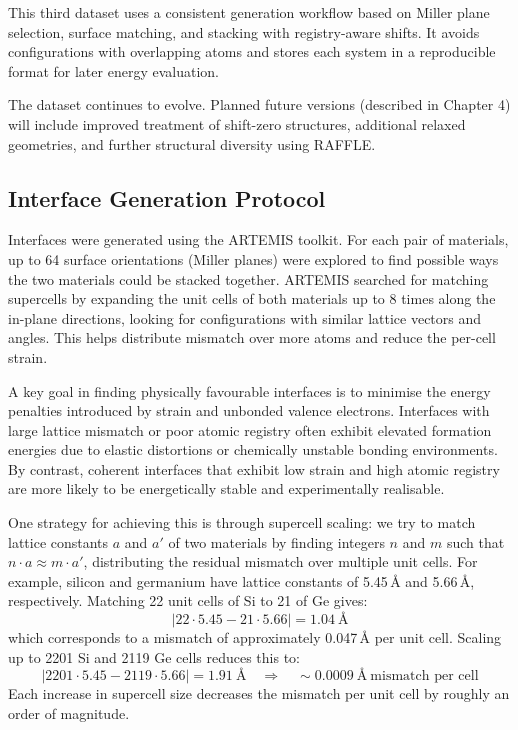 This third dataset uses a consistent generation workflow based on Miller plane selection, surface matching, and stacking with registry-aware shifts. It avoids configurations with overlapping atoms and stores each system in a reproducible format for later energy evaluation.

The dataset continues to evolve. Planned future versions (described in Chapter 4) will include improved treatment of shift-zero structures, additional relaxed geometries, and further structural diversity using RAFFLE.

\subsection{Interface Generation Protocol}

Interfaces were generated using the ARTEMIS toolkit. For each pair of materials, up to 64 surface orientations (Miller planes) were explored to find possible ways the two materials could be stacked together. ARTEMIS searched for matching supercells by expanding the unit cells of both materials up to 8 times along the in-plane directions, looking for configurations with similar lattice vectors and angles. This helps distribute mismatch over more atoms and reduce the per-cell strain.

A key goal in finding physically favourable interfaces is to minimise the energy penalties introduced by strain and unbonded valence electrons. Interfaces with large lattice mismatch or poor atomic registry often exhibit elevated formation energies due to elastic distortions or chemically unstable bonding environments. By contrast, coherent interfaces that exhibit low strain and high atomic registry are more likely to be energetically stable and experimentally realisable.

One strategy for achieving this is through supercell scaling: we try to match lattice constants $a$ and $a'$ of two materials by finding integers $n$ and $m$ such that $n \cdot a \approx m \cdot a'$, distributing the residual mismatch over multiple unit cells. For example, silicon and germanium have lattice constants of 5.45\,\AA{} and 5.66\,\AA{}, respectively. Matching 22 unit cells of Si to 21 of Ge gives:
\[
|22 \cdot 5.45 - 21 \cdot 5.66| = 1.04~\text{\AA}
\]
which corresponds to a mismatch of approximately 0.047\,\AA{} per unit cell. Scaling up to 2201 Si and 2119 Ge cells reduces this to:
\[
|2201 \cdot 5.45 - 2119 \cdot 5.66| = 1.91~\text{\AA} \quad \Rightarrow \quad \sim 0.0009~\text{\AA}~\text{mismatch per cell}
\]
Each increase in supercell size decreases the mismatch per unit cell by roughly an order of magnitude.


